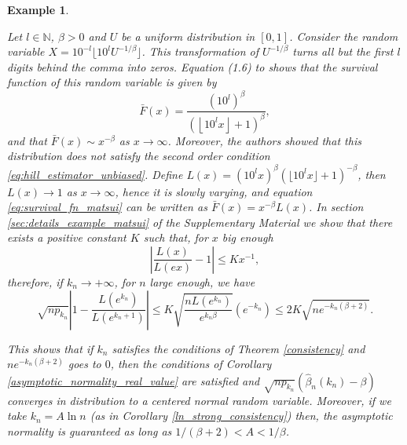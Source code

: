 \documentclass[sn-mathphys-ay]{sn-jnl}%
\newtheorem{example}{Example}%
\newcommand{\N}{\mathbb{N}}
\begin{document}
\begin{example}\label{ex:matsui}

    Let \(l\in\N\), \(\beta>0\) and \(U\) be a uniform distribution in \([0,1]\).
    Consider the random variable \(X=10^{-l} \lfloor 10^l U^{-1/\beta} \rfloor \). This
    transformation of $U^{-1/\beta}$ turns all but the first $l$ digits behind the comma
    into zeros. Equation (1.6) to \cite{Matsui2013} shows that the survival function of
    this random variable is given by
    \begin{equation}\label{eq:survival_fn_matsui}
        \bar{F}(x)=\frac{(10^l)^\beta}{\left( \left\lfloor 10^l x \right\rfloor + 1 \right)^\beta},
    \end{equation}
    and that \(\bar{F}(x)\sim x^{-\beta}\) as \(x\to\infty\). Moreover, the authors showed
    that this distribution does not satisfy the second order condition \eqref{eq:hill_estimator_unbiased}.
    Define \(L(x)={(10^lx)}^{\beta}({\lfloor 10^l x \rfloor+1})^{-\beta}\), then
    \(L(x)\to 1\) as \(x\to\infty\), hence it is slowly varying, and equation
    \eqref{eq:survival_fn_matsui} can be written as \(\bar{F}(x)=x^{-\beta}L(x)\). In
    section \ref{sec:details_example_matsui} of the Supplementary Material we show that
    there exists a positive constant \(K\) such that, for \(x\) big enough
    \begin{equation}\label{eq:svf_bound_matsui}
        \left|\frac{L(x)}{L(ex)}-1\right|\leq K x^{-1},
    \end{equation}
    therefore, if \(k_n\to +\infty\), for \(n\) large enough, we have
    \begin{equation}\label{eq:bound_asympt_norm_condition}
        \sqrt {np_{k_n}} \left| {1 - \frac{{L\left( {{e^{{k_n}}}} \right)}}{{L\left( {{e^{{k_n} + 1}}} \right)}}} \right|  \leq K\sqrt{\frac{nL(e^{k_n})}{e^{k_n\beta}}}\left(e^{-k_n}\right)\leq 2K\sqrt{n e^{-k_n(\beta+2)}}.
    \end{equation}

    This shows that if \(k_n\) satisfies the conditions of Theorem \ref{consistency} and
    \(n e^{-k_n(\beta+2)}\) goes to \(0\), then the conditions of Corollary
    \ref{asymptotic_normality_real_value} are satisfied and \(\sqrt {np_{k_n}} (
    {\widehat \beta_n ( {{k_n}} ) - \beta } )\) converges in distribution to a centered
    normal random variable. Moreover, if we take \(k_n=A\ln n\) (as in Corollary
    \ref{ln_strong_consistency}) then, the asymptotic normality is guaranteed as long as
    \(1/(\beta+2)<A<1/\beta\).
\end{example}
\end{document}
